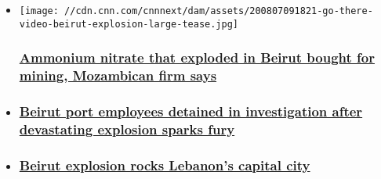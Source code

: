 \begin{itemize}
\item
  \href{/2020/08/07/middleeast/beirut-lebanon-ammonium-nitrate-explosion/index.html}{}

  \texttt{[image: //cdn.cnn.com/cnnnext/dam/assets/200807091821-go-there-video-beirut-explosion-large-tease.jpg]}

  \hypertarget{ammonium-nitrate-that-exploded-in-beirut-bought-for-mining-mozambican-firm-says-}{%
  \subsubsection{\texorpdfstring{\href{/2020/08/07/middleeast/beirut-lebanon-ammonium-nitrate-explosion/index.html}{Ammonium
  nitrate that exploded in Beirut bought for mining, Mozambican firm
  says
  }}{Ammonium nitrate that exploded in Beirut bought for mining, Mozambican firm says }}\label{ammonium-nitrate-that-exploded-in-beirut-bought-for-mining-mozambican-firm-says-}}
\item
  \hypertarget{beirut-port-employees-detained-in-investigation-after-devastating-explosion-sparks-fury}{%
  \subsubsection{\texorpdfstring{\href{/2020/08/06/middleeast/beirut-explosion-anger-intl-hnk/index.html}{Beirut
  port employees detained in investigation after devastating explosion
  sparks
  fury}}{Beirut port employees detained in investigation after devastating explosion sparks fury}}\label{beirut-port-employees-detained-in-investigation-after-devastating-explosion-sparks-fury}}
\item
  \hypertarget{beirut-explosion-rocks-lebanons-capital-city}{%
  \subsubsection{\texorpdfstring{\href{/middleeast/live-news/lebanon-beirut-explosion-live-updates-dle-intl/index.html}{Beirut
  explosion rocks Lebanon's capital
  city}}{Beirut explosion rocks Lebanon's capital city}}\label{beirut-explosion-rocks-lebanons-capital-city}}
\end{itemize}

